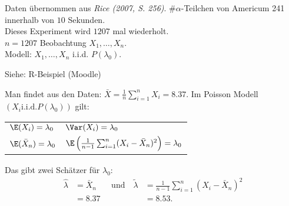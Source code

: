 \documentclass{tstextbook}
\begin{document}
\begin{example} Daten übernommen aus \textit{Rice (2007, S. 256)}.
	$ \# \alpha $-Teilchen von Americum 241 innerhalb von $ 10 $ Sekunden. \\
	Dieses Experiment wird $ 1207 $ mal wiederholt.\\
	$ n=1207 $ Beobachtung $ X_1,\ldots,X_n. $\\
	Modell: $ X_1,\ldots,X_n $ i.i.d. $ P(\lambda_0). $
	
	Siehe: R-Beispiel (Moodle)
	
	Man findet aus den Daten: $ \bar{X} = \frac{1}{n} \sum_{i=1}^{n} X_i = 8.37 $.
	Im Poisson Modell $ (X_i \text{i.i.d.} P(\lambda_0)) $ gilt: 
	
	\begin{tabular}{ll}
		$ \E(X_i)=\lambda_0 $ 			& $ \Var(X_i) = \lambda_0 $ \\
		$ \E(\bar{X}_n) = \lambda_0 $ 	& $ \E\left(\frac{1}{n-1} \sum_{i=1}^{n}(X_i - \bar{X}_n)^2\right) = \lambda_0 $
	\end{tabular}
	
	Das gibt zwei Schätzer für $ \lambda_0 $:
	\[
	\begin{aligned}
		\hat{\lambda} & = \bar{X}_n \quad & \text{und} \quad \tilde{\lambda} & = \frac{1}{n-1} \sum_{i=1}^{n}(X_i - \bar{X}_n)^2 \\
		& = 8.37 & 						& = 8.53.
	\end{aligned}
	\]
	

\end{example}
\end{document}
